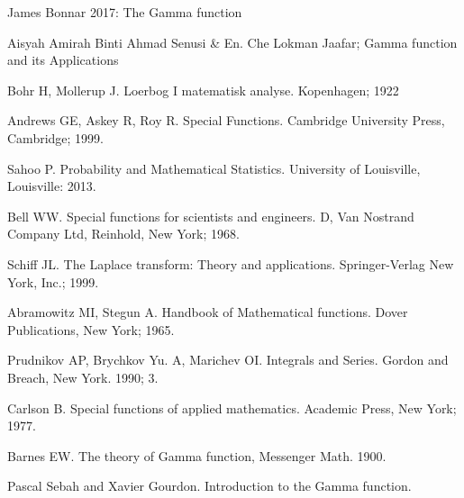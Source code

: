 \documentclass[11pt]{report}
\begin{document}
	\begin{description}
		\item James Bonnar 2017: The Gamma function
		
		\item Aisyah Amirah Binti Ahmad Senusi \& En. Che Lokman Jaafar; Gamma function and its Applications
		
		\item Bohr H, Mollerup J. Loerbog I matematisk analyse. Kopenhagen; 1922
		
		\item Andrews GE, Askey R, Roy R. Special Functions. Cambridge University Press, Cambridge; 1999.
		
		\item Sahoo P. Probability and Mathematical Statistics. University of Louisville, Louisville: 2013.
		
		\item Bell WW. Special functions for scientists and engineers. D, Van Nostrand Company Ltd, Reinhold, New York; 1968.
		
		\item Schiff JL. The Laplace transform: Theory and applications. Springer-Verlag New York, Inc.; 1999.
		
		\item Abramowitz MI, Stegun A. Handbook of Mathematical functions. Dover Publications, New York; 1965.
		
		\item Prudnikov AP, Brychkov Yu. A, Marichev OI. Integrals and Series. Gordon and Breach, New York. 1990; 3.
		
		\item Carlson B. Special functions of applied mathematics. Academic Press, New York; 1977.
		
		\item Barnes EW. The theory of Gamma function, Messenger Math. 1900.
		
		\item Pascal Sebah and Xavier Gourdon. Introduction to the Gamma function.

		
	\end{description}
	
\end{document}
